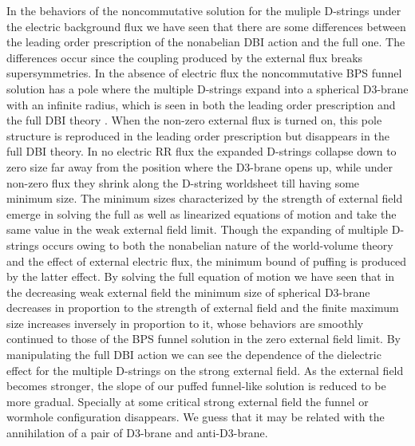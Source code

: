 \documentclass[12pt,a4paper]{article}
\begin{document}
In the behaviors of the noncommutative solution for the muliple D-strings
under the electric background flux we have seen that there are some
differences between the leading order prescription of the nonabelian
DBI action and the full one. The differences occur since the coupling
produced by the external flux breaks supersymmetries. 
In the absence of electric flux the
noncommutative BPS funnel solution has a pole where the multiple
D-strings expand into a spherical D3-brane with an infinite radius,
which is seen in both the leading order prescription and the full
DBI theory \cite{CMT}. When the non-zero external flux is turned on, this
pole structure is reproduced in the leading order prescription but
disappears in the full DBI theory. In no electric RR flux the 
expanded D-strings collapse down to zero size far away from the
position where the D3-brane opens up, while under non-zero flux they
shrink along the D-string worldsheet till having some minimum size.
The minimum sizes characterized by the strength of external field 
emerge in solving the full as well as linearized equations of motion
and take the same value in the weak external field limit.
Though the expanding of multiple D-strings occurs owing to both the
nonabelian nature of the world-volume theory and the effect of 
external electric flux, the minimum bound of puffing is 
produced by the latter effect. By solving the full equation of
motion we have seen that in the decreasing weak external field the minimum
size of spherical D3-brane decreases in proportion to the strength of
external field and the finite maximum size increases inversely in
proportion to it, whose behaviors are smoothly continued to those of
the BPS funnel solution in the zero external field limit.
By manipulating the full DBI action we can see the dependence of
the dielectric effect for the multiple D-strings on the strong
external field. As the external field becomes stronger, the slope of
our puffed funnel-like solution is reduced to be more gradual.
Specially at some critical strong external field the funnel
or wormhole configuration disappears. We guess that it may be 
related with the annihilation of a pair of D3-brane and
anti-D3-brane. 
\end{document}

